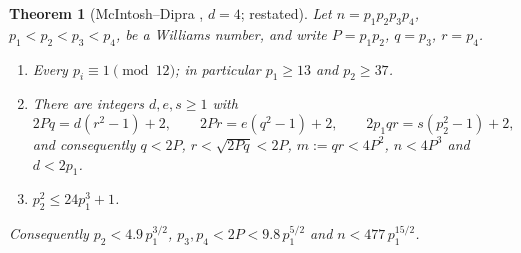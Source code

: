 \documentclass[11pt]{amsart}
\newtheorem{theorem}{Theorem}[section]
\theoremstyle{definition}
\theoremstyle{remark}
\begin{document}
\begin{theorem}[McIntosh--Dipra \cite{MD15}, $d=4$; restated]\label{thm:A}
Let $n=p_1p_2p_3p_4$, $p_1<p_2<p_3<p_4$, be a Williams number, and write $P=p_1p_2$, $q=p_3$, $r=p_4$.
\begin{enumerate}[label=\textup{(\alph*)}]
\item Every $p_i\equiv1\pmod{12}$; in particular $p_1\ge13$ and $p_2\ge37$.
\item There are integers $d,e,s\ge1$ with
\begin{equation}\label{eq:three}
2Pq=d(r^2-1)+2,\qquad 2Pr=e(q^2-1)+2,\qquad 2p_1qr=s(p_2^2-1)+2,
\end{equation}
and consequently $q<2P$, $r<\sqrt{2Pq}<2P$, $m:=qr<4P^2$, $n<4P^3$ and $d<2p_1$.
\item $p_2^2\le24p_1^3+1$.
\end{enumerate}
Consequently $p_2<4.9\,p_1^{3/2}$, $p_3,p_4<2P<9.8\,p_1^{5/2}$ and $n<477\,p_1^{15/2}$.
\end{theorem}
\end{document}
